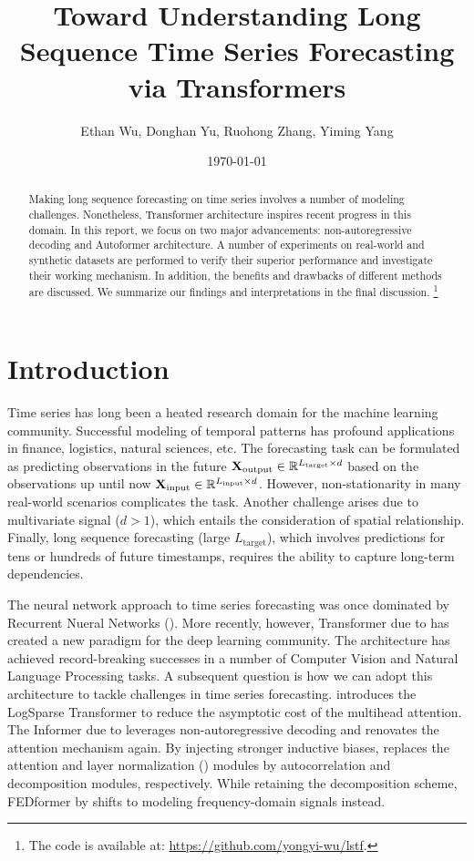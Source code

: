 \documentclass[12pt]{article}
\title{Toward Understanding Long Sequence Time Series Forecasting via Transformers}
\author{Ethan Wu, Donghan Yu, Ruohong Zhang, Yiming Yang}
\date{\today}
\begin{document}
\maketitle
\begin{abstract}
Making long sequence forecasting on time series involves a number of modeling challenges. 
Nonetheless, Transformer architecture inspires recent progress in this domain. 
In this report, we focus on two major advancements: non-autoregressive decoding and Autoformer architecture. 
A number of experiments on real-world and synthetic datasets are performed to verify their superior performance and investigate their working mechanism. 
In addition, the benefits and drawbacks of different methods are discussed. 
We summarize our findings and interpretations in the final discussion. \footnote{The code is available at: \href{https://github.com/yongyi-wu/lstf}{https://github.com/yongyi-wu/lstf}.}
\end{abstract}

\section{Introduction}
Time series has long been a heated research domain for the machine learning community. 
Successful modeling of temporal patterns has profound applications in finance, logistics, natural sciences, etc. 
The forecasting task can be formulated as predicting observations in the future $\mathbf{X}_\text{output} \in \mathbb{R}^{L_\text{target} \times d}$ based on the observations up until now $\mathbf{X}_\text{input} \in \mathbb{R}^{L_\text{input} \times d}$. 
However, non-stationarity in many real-world scenarios complicates the task. 
Another challenge arises due to multivariate signal ($d > 1$), which entails the consideration of spatial relationship. 
Finally, long sequence forecasting (large $L_\text{target}$), which involves predictions for tens or hundreds of future timestamps, requires the ability to capture long-term dependencies. 

The neural network approach to time series forecasting was once dominated by Recurrent Nueral Networks (\citet{https://doi.org/10.48550/arxiv.1703.07015}).  
More recently, however, Transformer due to \citet{https://doi.org/10.48550/arxiv.1706.03762} has created a new paradigm for the deep learning community. 
The architecture has achieved record-breaking successes in a number of Computer Vision and Natural Language Processing tasks. 
A subsequent question is how we can adopt this architecture to tackle challenges in time series forecasting. 
\citet{https://doi.org/10.48550/arxiv.1907.00235} introduces the LogSparse Transformer to reduce the asymptotic cost of the multihead attention. 
The Informer due to \citet{https://doi.org/10.48550/arxiv.2012.07436} leverages non-autoregressive decoding and renovates the attention mechanism again. 
By injecting stronger inductive biases, \citet{https://doi.org/10.48550/arxiv.2106.13008} replaces the attention and layer normalization (\citet{https://doi.org/10.48550/arxiv.1607.06450}) modules by autocorrelation and decomposition modules, respectively. 
While retaining the decomposition scheme, FEDformer by \citet{https://doi.org/10.48550/arxiv.2201.12740} shifts to modeling frequency-domain signals instead. 
\end{document}
